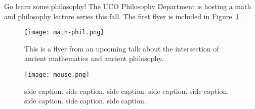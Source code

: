 \documentclass[12pt]{article}
\begin{document}
Go learn some philosophy! The UCO Philosophy Department is hosting a math and philosophy lecture series this fall.  The first flyer is included in Figure~\ref{fig::philosophy}.

\begin{figure}[h!]%
\centering
\texttt{[image: math-phil.png]}
\caption{This is a flyer from an upcoming talk about the intersection of ancient mathematics and ancient philosophy.}\label{fig::philosophy}
\end{figure}


\begin{figure}
\begin{minipage}{0.58\textwidth}%
\texttt{[image: mouse.png]}
\end{minipage}
\begin{minipage}{0.38\textwidth}
\caption{side caption. side caption. side caption. side caption. side caption. side caption. side caption. side caption.}
\end{minipage}

\end{figure}
\end{document}
